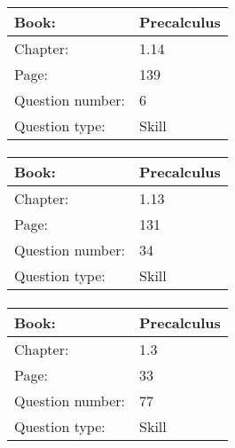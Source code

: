 \documentclass{article}
\begin{document}
            \paragraph{}
            \begin{tabularx}{1\textwidth}{
                    p{}
                    p{}
                }
                \toprule
                Book: & Precalculus
                \\
                \midrule
                Chapter: & 1.14
                \\
                \midrule
                Page: & 139
                \\
                \midrule
                Question number: & 6
                \\
                \midrule
                Question type: & Skill
                \\
                \bottomrule
            \end{tabularx}
            
            \paragraph{}
            \begin{tabularx}{1\textwidth}{
                    p{}
                    p{}
                }
                \toprule
                Book: & Precalculus
                \\
                \midrule
                Chapter: & 1.13
                \\
                \midrule
                Page: & 131
                \\
                \midrule
                Question number: & 34
                \\
                \midrule
                Question type: & Skill
                \\
                \bottomrule
            \end{tabularx}
            
            \paragraph{}
            \begin{tabularx}{1\textwidth}{
                    p{}
                    p{}
                }
                \toprule
                Book: & Precalculus
                \\
                \midrule
                Chapter: & 1.3
                \\
                \midrule
                Page: & 33
                \\
                \midrule
                Question number: & 77
                \\
                \midrule
                Question type: & Skill
                \\
                \bottomrule
            \end{tabularx}
            
\end{document}
